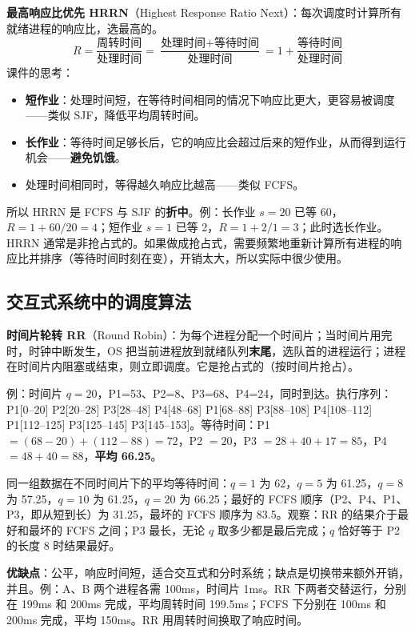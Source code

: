 \textbf{最高响应比优先 HRRN}（Highest Response Ratio Next）：每次调度时计算所有就绪进程的响应比，选最高的。
\[ R = \frac{\text{周转时间}}{\text{处理时间}} = \frac{\text{处理时间} + \text{等待时间}}{\text{处理时间}} = 1 + \frac{\text{等待时间}}{\text{处理时间}} \]
课件的思考：
\begin{itemize}
    \item \textbf{短作业}：处理时间短，在等待时间相同的情况下响应比更大，更容易被调度——类似 SJF，降低平均周转时间。
    \item \textbf{长作业}：等待时间足够长后，它的响应比会超过后来的短作业，从而得到运行机会——\textbf{避免饥饿}。
    \item 处理时间相同时，等得越久响应比越高——类似 FCFS。
\end{itemize}
所以 HRRN 是 FCFS 与 SJF 的\textbf{折中}。例：长作业 $s=20$ 已等 60，$R = 1 + 60/20 = 4$；短作业 $s=1$ 已等 2，$R = 1 + 2/1 = 3$；此时选长作业。HRRN 通常是非抢占式的。如果做成抢占式，需要频繁地重新计算所有进程的响应比并排序（等待时间时刻在变），开销太大，所以实际中很少使用。

\subsection{交互式系统中的调度算法}

\textbf{时间片轮转 RR}（Round Robin）：为每个进程分配一个时间片；当时间片用完时，时钟中断发生，OS 把当前进程放到就绪队列\textbf{末尾}，选队首的进程运行；进程在时间片内阻塞或结束，则立即调度。它是抢占式的（按时间片抢占）。

例：时间片 $q=20$，P1=53、P2=8、P3=68、P4=24，同时到达。执行序列：P1[0–20] P2[20–28] P3[28–48] P4[48–68] P1[68–88] P3[88–108] P4[108–112] P1[112–125] P3[125–145] P3[145–153]。等待时间：P1 $= (68-20)+(112-88) = 72$，P2 $= 20$，P3 $= 28+40+17 = 85$，P4 $= 48+40 = 88$，\textbf{平均 66.25}。

同一组数据在不同时间片下的平均等待时间：$q=1$ 为 62，$q=5$ 为 61.25，$q=8$ 为 57.25，$q=10$ 为 61.25，$q=20$ 为 66.25；最好的 FCFS 顺序（P2、P4、P1、P3，即从短到长）为 31.25，最坏的 FCFS 顺序为 83.5。观察：RR 的结果介于最好和最坏的 FCFS 之间；P3 最长，无论 $q$ 取多少都是最后完成；$q$ 恰好等于 P2 的长度 8 时结果最好。

\textbf{优缺点}：公平，响应时间短，适合交互式和分时系统；缺点是切换带来额外开销，并且。例：A、B 两个进程各需 100ms，时间片 1ms。RR 下两者交替运行，分别在 199ms 和 200ms 完成，平均周转时间 199.5ms；FCFS 下分别在 100ms 和 200ms 完成，平均 150ms。RR 用周转时间换取了响应时间。

